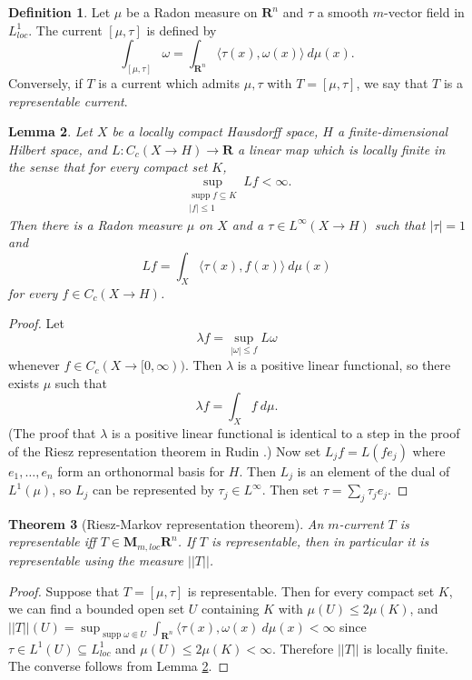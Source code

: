 \documentclass[reqno,12pt,letterpaper]{amsart}
\newcommand{\RR}{\mathbf{R}}
\newcommand{\MM}{\mathbf M}
\DeclareMathOperator{\supp}{supp}
\newcommand{\dfn}[1]{\emph{#1}\index{#1}}
\newtheorem{theorem}{Theorem}[section]
\newtheorem{lemma}[theorem]{Lemma}
\theoremstyle{definition}
\newtheorem{definition}[theorem]{Definition}
\numberwithin{equation}{section}
\begin{document}
\begin{definition}
Let $\mu$ be a Radon measure on $\RR^n$ and $\tau$ a smooth $m$-vector field in $L^1_{loc}$.
The current $[\mu, \tau]$ is defined by
$$\int_{[\mu, \tau]} \omega = \int_{\RR^n} \langle \tau(x), \omega(x)\rangle ~d\mu(x).$$
Conversely, if $T$ is a current which admits $\mu, \tau$ with $T = [\mu, \tau]$, we say that $T$ is a \dfn{representable current}.
\end{definition}

\begin{lemma}
\label{Riesz Markov Hilbert}
Let $X$ be a locally compact Hausdorff space, $H$ a finite-dimensional Hilbert space, and $L: C_c(X \to H) \to \RR$ a linear map which is locally finite in the sense that for every compact set $K$,
$$\sup_{\substack{\supp f \subseteq K\\|f| \leq 1}} Lf < \infty.$$
Then there is a Radon measure $\mu$ on $X$ and a $\tau \in L^\infty(X \to H)$ such that $|\tau| = 1$ and
$$Lf = \int_X \langle \tau(x), f(x)\rangle ~d\mu(x)$$
for every $f \in C_c(X \to H)$.
\end{lemma}
\begin{proof}
Let
$$\lambda f = \sup_{|\omega| \leq f} L\omega$$
whenever $f \in C_c(X \to [0, \infty))$.
Then $\lambda$ is a positive linear functional, so there exists $\mu$ such that
$$\lambda f = \int_X f~d\mu.$$
(The proof that $\lambda$ is a positive linear functional is identical to a step in the proof of the Riesz representation theorem in Rudin \cite{rudin1987real}.)
Now set $L_jf = L(fe_j)$ where $e_1, \dots, e_n$ form an orthonormal basis for $H$.
Then $L_j$ is an element of the dual of $L^1(\mu)$, so $L_j$ can be represented by $\tau_j \in L^\infty$.
Then set $\tau = \sum_j \tau_j e_j$.
\end{proof}

\begin{theorem}[Riesz-Markov representation theorem]
An $m$-current $T$ is representable iff $T \in \MM_{m,loc}\RR^n$.
If $T$ is representable, then in particular it is representable using the measure $||T||$.
\end{theorem}
\begin{proof}
Suppose that $T = [\mu, \tau]$ is representable. Then for every compact set $K$, we can find a bounded open set $U$ containing $K$ with $\mu(U) \leq 2\mu(K)$, and
$||T||(U) = \sup_{\supp \omega \Subset U} \int_{\RR^n} \langle \tau(x), \omega(x) ~d\mu(x) < \infty$
since $\tau \in L^1(U) \subseteq L^1_{loc}$ and $\mu(U) \leq 2\mu(K) < \infty$.
Therefore $||T||$ is locally finite.
The converse follows from Lemma \ref{Riesz Markov Hilbert}.
\end{proof}
\end{document}
